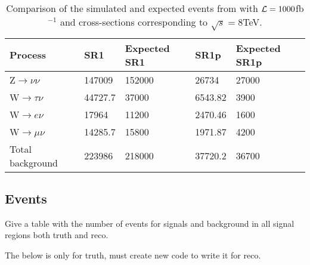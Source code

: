 \begin{table}[ht]
\begin{center}
\begin{tabular}{|l|l|l|l|l|}
\hline
Process & SR1  & Expected SR1 & SR1p  & Expected SR1p  \\ \hline
Z$\rightarrow\nu\nu$&147009&152000&26734&27000 \\
W$\rightarrow\tau\nu$&44727.7&37000&6543.82&3900 \\
W$\rightarrow e\nu$&17964&11200&2470.46&1600 \\
W$\rightarrow\mu\nu$&14285.7&15800&1971.87&4200 \\ \hline
Total background&223986&218000&37720.2&36700 \\ \hline
\end{tabular}
\caption{Comparison of the simulated and expected events from \citep{ATLAS-CONF-2012-147} with $\mathcal{L}=1000$fb$^{-1}$ and cross-sections corresponding to $\sqrt{s}=8$TeV.}
\label{tab:newcomp}
\end{center}
\end{table}


\subsection{Events}
Give a table with the number of events for signals and background in all signal regions both truth and reco.

The below is only for truth, must create new code to write it for reco.

